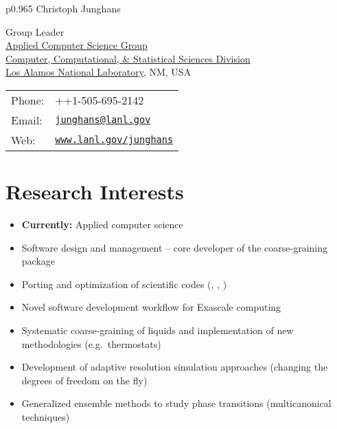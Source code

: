 \documentclass{article}
\begin{document}
\thispagestyle{plain}
\vspace*{-1.2cm}

\begin{tabular}{p{0.965\textwidth}}
{\huge Christoph Junghans}\\
\hline
\end{tabular}
\vspace{0.2in}

\begin{minipage}{0.55\linewidth}
  Group Leader\\ 
  \href{https://www.lanl.gov/org/ddste/aldsc/computer-computational-statistical-sciences/applied-computer-science/index.php}{Applied Computer Science Group}\\
  \href{https://www.lanl.gov/org/ddste/aldsc/computer-computational-statistical-sciences/index.php}{Computer, Computational, \& Statistical Sciences Division}\\
  \href{http://www.lanl.gov}{Los Alamos National Laboratory}, NM, USA
\end{minipage}
\begin{minipage}{0.45\linewidth}
  \begin{tabular}{ll}
    Phone: & ++1-505-695-2142 \\
    Email: & \href{mailto:junghans@lanl.gov}{\tt junghans@lanl.gov} \\
    Web: & \href{http://www.lanl.gov/junghans}{\tt www.lanl.gov/junghans} \\
  \end{tabular}
\end{minipage}

\section*{Research Interests}
\begin{itemize}
\setlength{\itemsep}{0pt}
\setlength{\parskip}{0pt}
\setlength{\parsep}{0pt}
\item \textbf{Currently:} Applied computer science
\item Software design and management -- core developer of the coarse-graining package 
\item Porting and optimization of scientific codes (, , )
\item Novel software development workflow for Exascale computing
\item Systematic coarse-graining of liquids and implementation of new methodologies (e.g.\ thermostats)
\item Development of adaptive resolution simulation approaches (changing the degrees of freedom on the fly)
\item Generalized ensemble methods to study phase transitions (multicanonical techniques)
\end{itemize}
\end{document}
